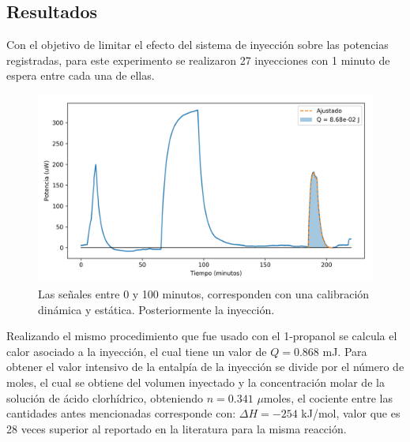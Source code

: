 \subsection{Resultados}
	Con el objetivo de limitar el efecto del sistema de inyecci\'on sobre las potencias registradas, para este experimento se realizaron 27 inyecciones con 1 minuto de espera entre cada una de ellas.
	\begin{figure}[h]
		\centering
		\includegraphics[width=\linewidth]{../Data/ChemicalCalibrations/HCl}
		\caption{Las se\~nales entre 0 y 100 minutos, corresponden con una calibraci\'on din\'amica y est\'atica. Posteriormente la inyecci\'on.}
		\label{fig: HClResults}
	\end{figure}

	Realizando el mismo procedimiento que fue usado con el 1-propanol se calcula el calor asociado a la inyecci\'on, el cual tiene un valor de $Q = 0.868$ mJ. Para obtener el valor intensivo de la entalp\'ia de la inyecci\'on se divide por el n\'umero de moles, el cual se obtiene del volumen inyectado y la concentraci\'on molar de la soluci\'on de \'acido clorh\'idrico, obteniendo $n = 0.341$ $\mu$moles, el cociente entre las cantidades antes mencionadas corresponde con: $\Delta H = -254$ kJ/mol, valor que es 28 veces superior al reportado en la literatura para la misma reacci\'on.  
	
